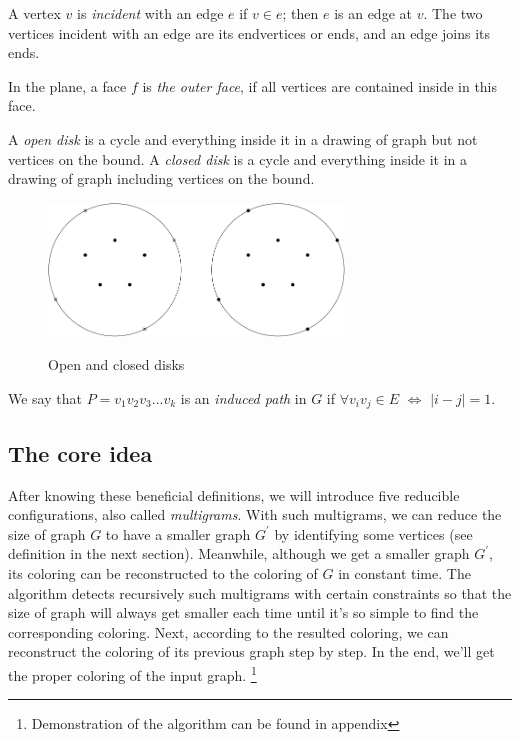 \begin{definition}
A vertex $v$ is \textit{incident} with an edge $e$ if $v \in e$; then $e$ is an edge at $v$. The two vertices incident with an edge are its endvertices or ends, and an edge joins its ends. \cite{diestel2010graph}
\end{definition}

\begin{definition}
In the plane, a face $f$ is \textit{the outer face}, if all vertices are contained inside in this face. 
\end{definition}

\begin{definition}
A \textit{open disk} is a cycle and everything inside it in a drawing of graph but not vertices on the bound. A \textit{closed disk} is a cycle and everything inside it in a drawing of graph including vertices on the bound.

\begin{figure}[H] %
\centering %
\includegraphics[width=0.7\textwidth]{figure/closeddisk.png} 
\label{figure} %
\caption{Open and closed disks}
\end{figure}
\end{definition}

\begin{definition}
We say that $P = v_1v_2v_3...v_k$ is an \textit{induced path} in $G$ if $\forall v_iv_j \in E$ $\Longleftrightarrow$ $|i - j| = 1$.
\end{definition}

\subsection{The core idea}
After knowing these beneficial definitions, we will introduce five reducible configurations, also called \textit{multigrams}. With such multigrams, we can reduce the size of graph $G$ to have a smaller graph $G^{'}$ by identifying some vertices (see definition in the next section). Meanwhile, although we get a smaller graph $G^{'}$, its coloring can be reconstructed to the coloring of $G$ in constant time. The algorithm detects recursively such multigrams with certain constraints so that the size of graph will always get smaller each time until it's so simple to find the corresponding coloring. Next, according to the resulted coloring, we can reconstruct the coloring of its previous graph step by step. In the end, we'll get the proper coloring of the input graph. \footnote{Demonstration of the algorithm can be found in appendix}

